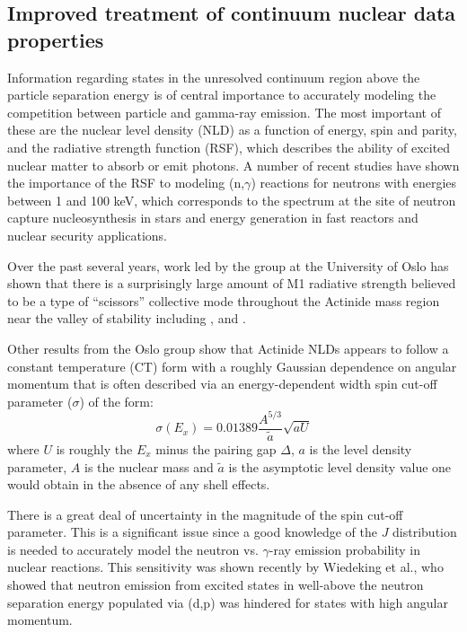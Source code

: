 \documentclass[letterpaper]{ar-1col}
\newcommand{\pp}[1]{\left( #1\right)}
\begin{document}
\subsection{Improved treatment of continuum nuclear data properties}

Information regarding states in the unresolved continuum region above the particle separation energy is of central importance to accurately modeling the competition between particle and gamma-ray emission.  The most important of these are the nuclear level density (NLD) as a function of energy, spin and parity, and the radiative strength function (RSF), which describes the ability of excited nuclear matter to absorb or emit photons.  A number of recent studies have shown the importance of the RSF to modeling (n,$\gamma$) reactions for neutrons with energies between 1 and 100 keV, which corresponds to the spectrum at the site of neutron capture nucleosynthesis in stars \cite{PhysRevC.82.014318, Lar15} and energy generation in fast reactors and nuclear security applications.   

Over the past several years, work led by the group at the University of Oslo has shown that there is a surprisingly large amount of M1 radiative strength believed to be a type of \enquote{scissors} collective mode throughout the Actinide mass region near the valley of stability including ,  and  \cite{Lap16, Gut13, Gut13a, Gut14, Gut15}.

Other results from the Oslo group show that Actinide NLDs appears to follow a constant temperature (CT) form with a roughly Gaussian dependence on angular momentum that is often described via an energy-dependent width spin cut-off parameter ($\sigma$) of the form: 
\begin{equation}\label{eqn:spin_cutoff}
\sigma\pp{E_x}=0.01389 \dfrac{A^{5/3}}{\widetilde{a}}\sqrt{aU}
\end{equation}
where $U$ is roughly the $E_x$ minus the pairing gap $\Delta$, $a$ is the level density parameter, $A$ is the nuclear mass and $\widetilde{a}$ is the asymptotic level density value one would obtain in the absence of any shell effects. 

There is a great deal of uncertainty in the magnitude of the spin cut-off parameter.  This is a significant issue since a good knowledge of the $J$ distribution is needed to accurately model the neutron vs. $\gamma$-ray emission probability in nuclear reactions.  This sensitivity was shown recently by Wiedeking et al., \cite{Wie16} who showed that neutron emission from excited states in  well-above the neutron separation energy populated via (d,p) was hindered for states with high angular momentum. 
\end{document}
